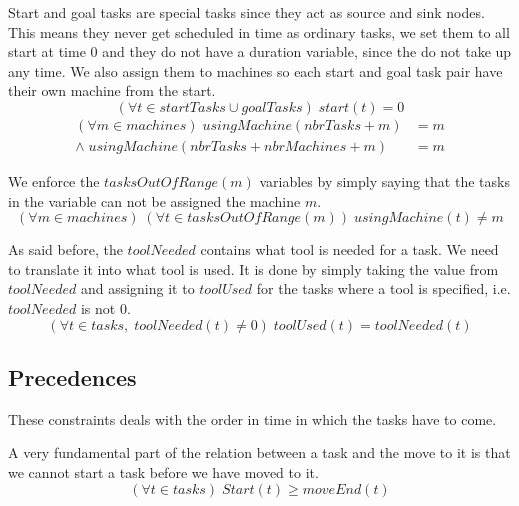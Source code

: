   \noindent Start and goal tasks are special tasks since they act as source and sink nodes. This means they never get scheduled in time as ordinary tasks, we set them to all start at time $0$ and they do not have a duration variable, since the do not take up any time. We also assign them to machines so each start and goal task pair have their own machine from the start.
 \begin{equation}\label{eq:93}
 (\forall t \in startTasks \cup goalTasks) \; start(t) = 0
 \end{equation}
 \begin{equation}
 \begin{aligned}\label{eq:94}
 (\forall m \in machines) \; usingMachine(nbrTasks + m) &= m\\
 \land \; usingMachine(nbrTasks + nbrMachines + m) &= m
 \end{aligned}
 \end{equation}

  \noindent We enforce the $tasksOutOfRange(m)$ variables by simply saying that the tasks in the variable can not be assigned the machine $m$.
 \begin{equation}\label{eq:95}
 (\forall m \in machines) \; (\forall t \in tasksOutOfRange(m)) \; usingMachine(t) \neq m
 \end{equation}

  \noindent As said before, the $toolNeeded$ contains what tool is needed for a task. We need to translate it into what tool is used. It is done by simply taking the value from $toolNeeded$ and assigning it to $toolUsed$ for the tasks where a tool is specified, i.e. $toolNeeded$ is not $0$.
 \begin{equation}\label{eq:117}
 (\forall t \in tasks, \; toolNeeded(t) \neq 0) \; toolUsed(t) = toolNeeded(t)
 \end{equation}

 
 \subsection{Precedences}
 These constraints deals with the order in time in which the tasks have to come.

  \noindent A very fundamental part of the relation between a task and the move to it is that we cannot start a task before we have moved to it.
  \begin{equation}\label{eq:107}
  (\forall t \in tasks) \; Start(t) \geq moveEnd(t)
  \end{equation}

